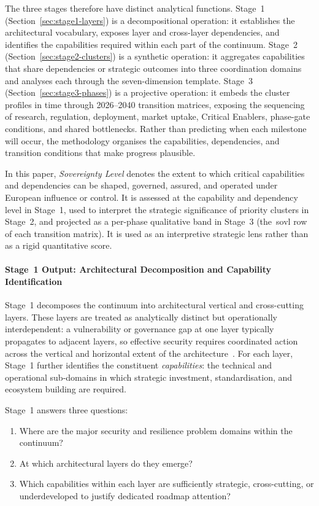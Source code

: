 \documentclass{ieeeaccess}
\begin{document}
The three stages therefore have distinct analytical functions. Stage~1 (Section~\ref{sec:stage1-layers}) is a decompositional operation: it establishes the architectural vocabulary, exposes layer and cross-layer dependencies, and identifies the capabilities required within each part of the continuum. Stage~2 (Section~\ref{sec:stage2-clusters}) is a synthetic operation: it aggregates capabilities that share dependencies or strategic outcomes into three coordination domains and analyses each through the seven-dimension template. Stage~3 (Section~\ref{sec:stage3-phases}) is a projective operation: it embeds the cluster profiles in time through 2026--2040 transition matrices, exposing the sequencing of research, regulation, deployment, market uptake, Critical Enablers, phase-gate conditions, and shared bottlenecks. Rather than predicting when each milestone will occur, the methodology organises the capabilities, dependencies, and transition conditions that make progress plausible.

In this paper, \emph{Sovereignty Level} denotes the extent to which critical capabilities and dependencies can be shaped, governed, assured, and operated under European influence or control. It is assessed at the capability and dependency level in Stage~1, used to interpret the strategic significance of priority clusters in Stage~2, and projected as a per-phase qualitative band in Stage~3 (the~\gls{sovl} row of each transition matrix). It is used as an interpretive strategic lens rather than as a rigid quantitative score.

\paragraph{Stage~1 Output: Architectural Decomposition and Capability Identification}
Stage~1 decomposes the continuum into architectural vertical and cross-cutting layers. These layers are treated as analytically distinct but operationally interdependent: a vulnerability or governance gap at one layer typically propagates to adjacent layers, so effective security requires coordinated action across the vertical and horizontal extent of the architecture~\cite{alwarafy2021,ranaweera2021}. For each layer, Stage~1 further identifies the constituent \emph{capabilities}: the technical and operational sub-domains in which strategic investment, standardisation, and ecosystem building are required.

Stage~1 answers three questions:
\begin{enumerate}
    \item Where are the major security and resilience problem domains within the continuum?
    \item At which architectural layers do they emerge?
    \item Which capabilities within each layer are sufficiently strategic, cross-cutting, or underdeveloped to justify dedicated roadmap attention?
\end{enumerate}
\end{document}
